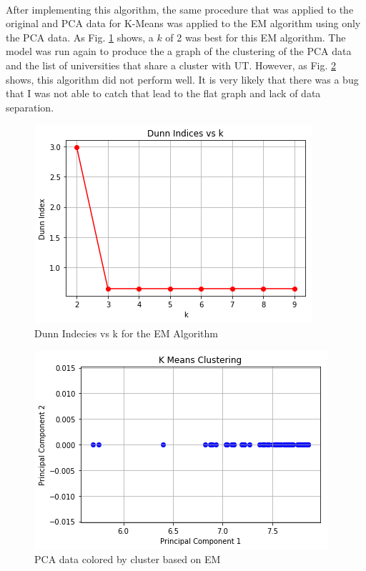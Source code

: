 \documentclass[12pt]{article}
\begin{document}
    \paragraph{}
    After implementing this algorithm, the same procedure that was applied to the original and PCA data for K-Means was applied to the EM algorithm using only the PCA data. As Fig. \ref{DunEM} shows, a $k$ of 2 was best for this EM algorithm. The model was run again to produce the a graph of the clustering of the PCA data and the list of universities that share a cluster with UT. However, as Fig. \ref{EM} shows, this algorithm did not perform well. It is very likely that there was a bug that I was not able to catch that lead to the flat graph and lack of data separation.
    \begin{figure}
    	\includegraphics[width=\linewidth]{Pictures/DunEM.png}
    	\caption{Dunn Indecies vs k for the EM Algorithm}
    	\label{DunEM}
    \end{figure}
    \begin{figure}
    	\includegraphics[width=\linewidth]{Pictures/EM.png}
    	\caption{PCA data colored by cluster based on EM}
    	\label{EM}
    \end{figure}
\end{document}
